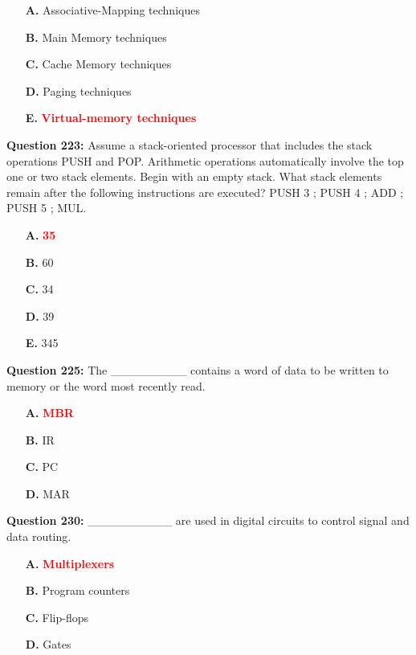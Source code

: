 \documentclass[12pt,a4paper]{article}
\begin{document}
\begin{itemize}
    \item[\textbf{A.}] Associative-Mapping techniques
    \item[\textbf{B.}] Main Memory techniques
    \item[\textbf{C.}] Cache Memory techniques
    \item[\textbf{D.}] Paging techniques
    \item[\textbf{E.}] \textcolor{red}{\textbf{Virtual-memory techniques}}
\end{itemize}

\vspace{0.5cm}

\textbf{Question 223:} Assume a stack-oriented processor that includes the stack operations PUSH and POP. Arithmetic operations automatically involve the top one or two stack elements. Begin with an empty stack. What stack elements remain after the following instructions are executed? PUSH 3 ; PUSH 4 ; ADD ; PUSH 5 ; MUL.

\begin{itemize}
    \item[\textbf{A.}] \textcolor{red}{\textbf{35}}
    \item[\textbf{B.}] 60
    \item[\textbf{C.}] 34
    \item[\textbf{D.}] 39
    \item[\textbf{E.}] 345
\end{itemize}

\vspace{0.5cm}

\textbf{Question 225:} The _________ contains a word of data to be written to memory or the word most recently read.

\begin{itemize}
    \item[\textbf{A.}] \textcolor{red}{\textbf{MBR}}
    \item[\textbf{B.}] IR
    \item[\textbf{C.}] PC
    \item[\textbf{D.}] MAR
\end{itemize}

\vspace{0.5cm}

\textbf{Question 230:} __________ are used in digital circuits to control signal and data routing.

\begin{itemize}
    \item[\textbf{A.}] \textcolor{red}{\textbf{Multiplexers}}
    \item[\textbf{B.}] Program counters
    \item[\textbf{C.}] Flip-flops
    \item[\textbf{D.}] Gates
\end{itemize}
\end{document}
